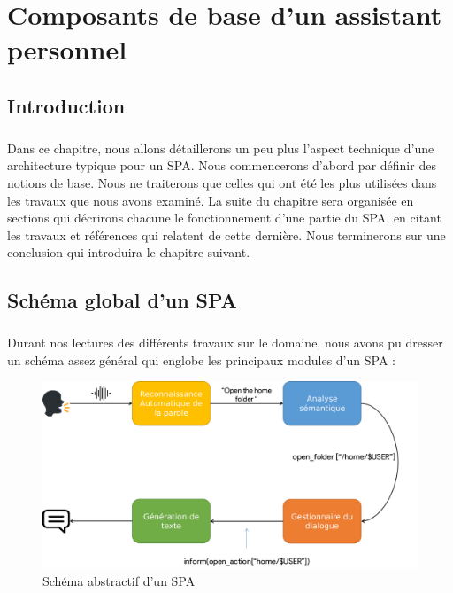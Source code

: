 \chapter{Composants de base d'un assistant personnel}

\section{Introduction}
	\paragraph{}
	Dans ce chapitre, nous allons détaillerons un peu plus l'aspect technique d'une architecture typique pour un SPA. Nous commencerons d'abord par définir des notions de base. Nous ne  traiterons que celles qui ont été les plus utilisées dans les travaux que nous avons examiné. La suite du chapitre sera organisée en sections qui décrirons chacune le fonctionnement d'une partie du SPA, en citant les travaux et références qui relatent de cette dernière. Nous terminerons sur une conclusion qui introduira le chapitre suivant.
	
\section{Schéma global d'un SPA}
\label{spaSchemSection}
\paragraph{}
Durant nos lectures des différents travaux sur le domaine, nous avons pu dresser un schéma assez général qui englobe les principaux modules d'un SPA : 
\begin{figure}[H]
	\centering
	\includegraphics[width=0.75\linewidth]{images/SPA_diagram_2.png}
	\caption{Schéma abstractif d'un SPA \cite{spa_arch}}
	\label{fig:spaDiagram}
\end{figure}

